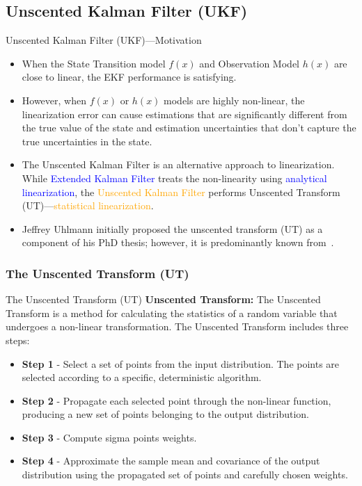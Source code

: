\subsection{Unscented Kalman Filter (UKF)}
\begin{frame}{Unscented Kalman Filter (UKF)---Motivation}
\begin{itemize}
    \item When the State Transition model $f(x)$ and
Observation Model $h(x)$ are close to linear, the EKF performance is satisfying.
    \item However, when $f(x)$ or $h(x)$ models are highly non-linear, the linearization error can cause estimations that are significantly different from the true value of the state and estimation uncertainties that don’t capture the true uncertainties in the state.

    \item The Unscented Kalman Filter is an alternative approach to linearization. While \textcolor{blue}{Extended Kalman Filter} treats the non-linearity using \textcolor{blue}{analytical linearization}, the \textcolor{orange}{Unscented Kalman Filter} performs Unscented Transform (UT)---\textcolor{orange}{statistical linearization}.

    \item Jeffrey Uhlmann initially proposed the unscented transform (UT) as a component of his PhD thesis; however, it is predominantly known from~\cite{julier1997new}.
\end{itemize}

\end{frame}

\subsubsection{The Unscented Transform (UT)}
\begin{frame}{The Unscented Transform (UT)}
\textbf{Unscented Transform:} The Unscented Transform is a method for calculating the statistics of a random
variable that undergoes a non-linear transformation.
The Unscented Transform includes three steps:
\begin{itemize}
    \item \textbf{Step 1} - Select a set of points from the input distribution. The points are selected according to a specific, deterministic algorithm.

    \item \textbf{Step 2} - Propagate each selected point through the non-linear function, producing a new set of points belonging to the output distribution.

    \item \textbf{Step 3} - Compute sigma points weights.

    \item \textbf{Step 4} - Approximate the sample mean and covariance of the output distribution using the propagated set of points and carefully chosen weights.
\end{itemize}
\end{frame}

